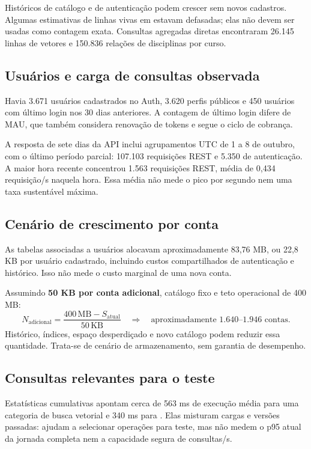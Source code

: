 \documentclass[10pt,a4paper]{article}
\newcommand{\code}[1]{{\ttfamily\footnotesize\detokenize{#1}}}
\begin{document}
Históricos de catálogo e de autenticação podem crescer sem novos cadastros. Algumas estimativas de linhas vivas em \code{pg_stat_user_tables} estavam defasadas; elas não devem ser usadas como contagem exata. Consultas agregadas diretas encontraram 26.145 linhas de vetores e 150.836 relações de disciplinas por curso.

\subsection{Usuários e carga de consultas observada}
Havia 3.671 usuários cadastrados no Auth, 3.620 perfis públicos e 450 usuários com último login nos 30 dias anteriores. A contagem de último login difere de MAU, que também considera renovação de tokens e segue o ciclo de cobrança.

A resposta de sete dias da API inclui agrupamentos UTC de 1 a 8 de outubro, com o último período parcial: 107.103 requisições REST e 5.350 de autenticação. A maior hora recente concentrou 1.563 requisições REST, média de 0,434 requisição/s naquela hora. Essa média não mede o pico por segundo nem uma taxa sustentável máxima.

\subsection{Cenário de crescimento por conta}
As tabelas associadas a usuários alocavam aproximadamente 83,76 MB, ou 22,8 KB por usuário cadastrado, incluindo custos compartilhados de autenticação e histórico. Isso não mede o custo marginal de uma nova conta.

Assumindo \textbf{50 KB por conta adicional}, catálogo fixo e teto operacional de 400 MB:
\[
N_{\mathrm{adicional}}=\frac{400\,\mathrm{MB}-S_{\mathrm{atual}}}{50\,\mathrm{KB}}
\quad\Rightarrow\quad \text{aproximadamente 1.640–1.946 contas.}
\]
Histórico, índices, espaço desperdiçado e novo catálogo podem reduzir essa quantidade. Trata-se de cenário de armazenamento, sem garantia de desempenho.

\subsection{Consultas relevantes para o teste}
Estatísticas cumulativas apontam cerca de 563 ms de execução média para uma categoria de busca vetorial e 340 ms para \code{casar_disciplinas}. Elas misturam cargas e versões passadas: ajudam a selecionar operações para teste, mas não medem o p95 atual da jornada completa nem a capacidade segura de consultas/s.
\end{document}
